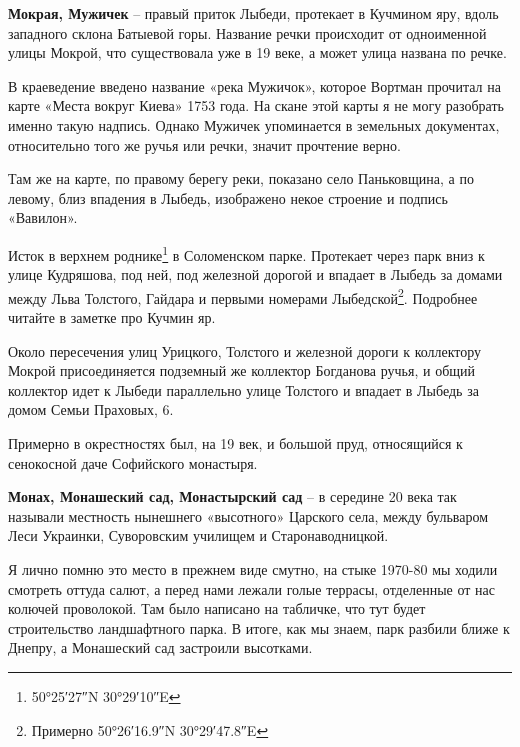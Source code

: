 \medskip

\textbf{Мокрая, Мужичек} – правый приток Лыбеди, протекает в Кучмином яру, вдоль западного склона Батыевой горы. Название речки происходит от одноименной улицы Мокрой, что существовала уже в 19 веке, а может улица названа по речке.

В краеведение введено название «река Мужичок», которое Вортман прочитал на карте «Места вокруг Киева» 1753 года. На скане этой карты я не могу разобрать именно такую надпись. Однако Мужичек упоминается в земельных документах, относительно того же ручья или речки, значит прочтение верно.

Там же на карте, по правому берегу реки, показано село Паньковщина, а по левому, близ впадения в Лыбедь, изображено некое строение и подпись «Вавилон».

Исток в верхнем роднике\footnote{50°25′27″N   30°29′10″E} в Соломенском парке. Протекает через парк вниз к улице Кудряшова, под ней, под железной дорогой и впадает в Лыбедь за домами между Льва Толстого, Гайдара и первыми номерами Лыбедской\footnote{Примерно 50°26′16.9″N 30°29′47.8″E}. Подробнее читайте в заметке про Кучмин яр.

Около пересечения улиц Урицкого, Толстого и железной дороги к коллектору Мокрой присоединяется подземный же коллектор Богданова ручья, и общий коллектор идет к Лыбеди параллельно улице Толстого и впадает в Лыбедь за домом Семьи Праховых, 6.




Примерно в окрестностях был, на 19 век, и большой пруд, относящийся к сенокосной даче Софийского монастыря.\\

\medskip




\textbf{Монах, Монашеский сад, Монастырский сад} – в середине 20 века так называли местность нынешнего «высотного» Царского села, между бульваром Леси Украинки, Суворовским училищем и Старонаводницкой. 

Я лично помню это место в прежнем виде смутно, на стыке 1970-80 мы ходили смотреть оттуда салют, а перед нами лежали голые террасы, отделенные от нас колючей проволокой. Там было написано на табличке, что тут будет строительство ландшафтного парка. В итоге, как мы знаем, парк разбили ближе к Днепру, а Монашеский сад застроили высотками. 

